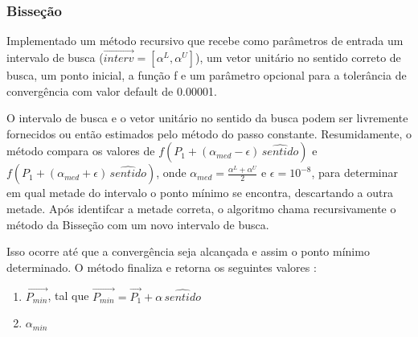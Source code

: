 \documentclass[10pt, a4paper]{article}
\begin{document}
\subsubsection{Bisseção}
Implementado um método recursivo que recebe como parâmetros de entrada um intervalo de busca
($\overrightarrow{interv} = [\alpha^L, \alpha^U]$), um vetor unitário no sentido correto
de busca, um ponto inicial, a função f e um parâmetro opcional para a tolerância de convergência com valor default de 0.00001.

O intervalo de busca e o vetor unitário no sentido da busca podem ser livremente fornecidos ou então estimados
pelo método do passo constante. Resumidamente, o método compara os valores de 
$f(P_1 + (\alpha_{med}- \epsilon)\,\hat{sentido})$ e $f(P_1 + (\alpha_{med}+ \epsilon)\,\hat{sentido})$,
onde $\alpha_{med} = \frac{\alpha^L + \alpha^U}{2}$ e $\epsilon = 10^{-8}$, para determinar em qual metade do intervalo
o ponto mínimo se encontra, descartando a outra metade. Após identifcar a metade correta, o algoritmo
chama recursivamente o método da Bisseção com um novo intervalo de busca.
 
Isso ocorre até que a convergência seja alcançada e assim o ponto mínimo determinado. O método finaliza e 
retorna os seguintes valores :

\begin{enumerate}
  \item $\overrightarrow{P_{min}}$, tal que $\overrightarrow{P_{min}} = \overrightarrow{P_1} + \alpha\,\hat{sentido}$
  \item $\alpha_{min}$
\end{enumerate} 
\end{document}
